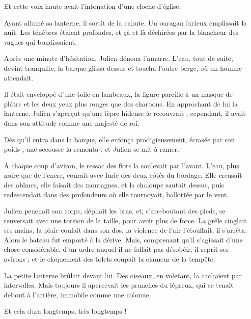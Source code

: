 \documentclass[]{book}
\begin{document}
                Et cette voix haute avait l'intonation d'une cloche d'église.
                    
                Ayant allumé sa lanterne, il sortit de la cahute. Un ouragan furieux emplissait la nuit. Les ténèbres étaient profondes, et çà et là déchirées par la blancheur des vagues qui bondissaient.
                    
                Après une minute d'hésitation, Julien dénoua l'amarre. L'eau, tout de suite, devint tranquille, la barque glissa dessus et toucha l'autre berge, où un homme attendait.
                    
                Il était enveloppé d'une toile en lambeaux, la figure pareille à un masque de plâtre et les deux yeux plus rouges que des charbons. En approchant de lui la lanterne, Julien s'aperçut qu'une lèpre hideuse le recouvrait ; cependant, il avait dans son attitude comme une majesté de roi.
                    
                Dès qu'il entra dans la barque, elle enfonça prodigieusement, écrasée par son poids ; une secousse la remonta ; et Julien se mit à ramer.
                    
                À chaque coup d'aviron, le ressac des flots la soulevait par l'avant. L'eau, plus noire que de l'encre, courait avec furie des deux côtés du bordage. Elle creusait des abîmes, elle faisait des montagnes, et la chaloupe sautait dessus, puis redescendait dans des profondeurs où elle tournoyait, ballottée par le vent.
                    
                Julien penchait son corps, dépliait les bras, et, s'arc-boutant des pieds, se renversait avec une torsion de la taille, pour avoir plus de force. La grêle cinglait ses mains, la pluie coulait dans son dos, la violence de l'air l'étouffait, il s'arrêta. Alors le bateau fut emporté à la dérive. Mais, comprenant qu'il s'agissait d'une chose considérable, d'un ordre auquel il ne fallait pas désobéir, il reprit ses avirons ; et le claquement des tolets coupait la clameur de la tempête.
                    
                La petite lanterne brûlait devant lui. Des oiseaux, en voletant, la cachaient par intervalles. Mais toujours il apercevait les prunelles du lépreux, qui se tenait debout à l'arrière, immobile comme une colonne.
                    
                Et cela dura longtemps, très longtemps !
                    
\end{document}
